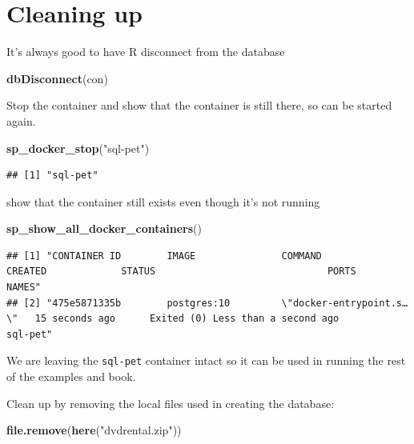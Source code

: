 \documentclass[]{book}
\newenvironment{Shaded}{\begin{snugshade}}{\end{snugshade}}
\newcommand{\KeywordTok}[1]{\textcolor[rgb]{0.13,0.29,0.53}{\textbf{#1}}}
\newcommand{\NormalTok}[1]{#1}
\newcommand{\StringTok}[1]{\textcolor[rgb]{0.31,0.60,0.02}{#1}}
\theoremstyle{definition}
\theoremstyle{definition}
\theoremstyle{definition}
\theoremstyle{remark}
\begin{document}
\hypertarget{cleaning-up-1}{%
\section{Cleaning up}\label{cleaning-up-1}}

It's always good to have R disconnect from the database

\begin{Shaded}
\begin{Highlighting}[]
\KeywordTok{dbDisconnect}\NormalTok{(con)}
\end{Highlighting}
\end{Shaded}

Stop the container and show that the container is still there, so can be
started again.

\begin{Shaded}
\begin{Highlighting}[]
\KeywordTok{sp_docker_stop}\NormalTok{(}\StringTok{"sql-pet"}\NormalTok{)}
\end{Highlighting}
\end{Shaded}

\begin{verbatim}
## [1] "sql-pet"
\end{verbatim}

show that the container still exists even though it's not running

\begin{Shaded}
\begin{Highlighting}[]
\KeywordTok{sp_show_all_docker_containers}\NormalTok{()}
\end{Highlighting}
\end{Shaded}

\begin{verbatim}
## [1] "CONTAINER ID        IMAGE               COMMAND                  CREATED             STATUS                              PORTS               NAMES"    
## [2] "475e5871335b        postgres:10         \"docker-entrypoint.s…\"   15 seconds ago      Exited (0) Less than a second ago                       sql-pet"
\end{verbatim}

We are leaving the \texttt{sql-pet} container intact so it can be used
in running the rest of the examples and book.

Clean up by removing the local files used in creating the database:

\begin{Shaded}
\begin{Highlighting}[]
\KeywordTok{file.remove}\NormalTok{(}\KeywordTok{here}\NormalTok{(}\StringTok{"dvdrental.zip"}\NormalTok{))}
\end{Highlighting}
\end{Shaded}
\end{document}
